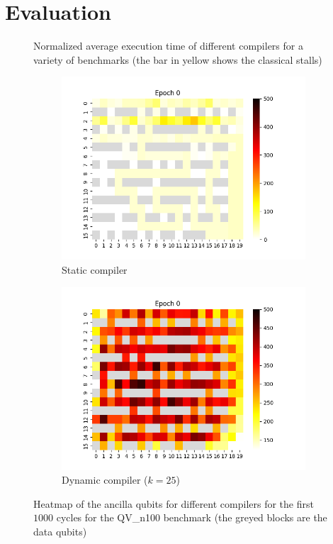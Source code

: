 \section{Evaluation}
\begin{figure}
    \centering
    
    \caption{Normalized average execution time of different compilers for a variety of benchmarks (the bar in yellow shows the classical stalls)}
    \label{fig:plot}
\end{figure}

\begin{figure}
    \centering
    \begin{subfigure}{\columnwidth}
        \includegraphics[width=0.9\linewidth]{figs/heatmap_static.png}
        \caption{Static compiler}
    \end{subfigure}
    \begin{subfigure}{\columnwidth}
        \includegraphics[width=0.9\linewidth]{figs/heatmap_dynamic.png}
        \caption{Dynamic compiler ($k = 25$)}
    \end{subfigure}
    \caption{Heatmap of the ancilla qubits for different compilers for the first $1000$ cycles for the QV\_n100 benchmark (the greyed blocks are the data qubits)}
    \label{fig:heatmap}
\end{figure}

